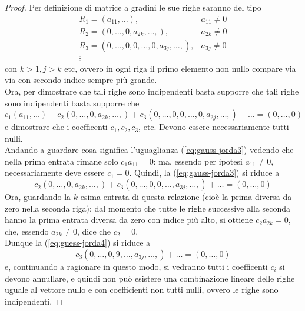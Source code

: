 \begin{proof}
  Per definizione di matrice a gradini le sue righe saranno del tipo
  \begin{eqnarray*}
    R_1=(a_{11},\dots), & a_{11}\neq0\\
    R_2=(0,\dots, 0, a_{2k},\dots,), & a_{2k}\neq 0\\
    R_3=(0,\dots,0,0,\dots,0,a_{3j},\dots,), & a_{3j}\neq 0\\
    \vdots
  \end{eqnarray*}
  con $k>1,j>k$ etc, ovvero in ogni riga il primo elemento non nullo
  compare via via con secondo indice sempre più grande.\\
  Ora, per dimostrare che tali righe sono indipendenti basta supporre che
  tali righe sono indipendenti basta supporre che
  \begin{equation}
    \label{eq:gauss-jorda3}
    c_1(a_{11},\dots)+c_2(0,\dots,0,a_{2k},\dots,)+c_3(0,\dots,0,0,\dots,
    0,a_{3j},\dots,)+\dots=(0,\dots,0)
  \end{equation}
  e dimostrare che i coefficenti $c_1,c_2,c_3$, etc. Devono essere
  necessariamente tutti nulli.\\
  Andando a guardare cosa significa l'uguaglianza (\ref{eq:gauss-jorda3})
  vedendo che nella prima entrata rimane solo $c_1a_{11}=0$: ma, essendo
  per ipotesi $a_{11}\neq 0$, necessariamente deve essere $c_1=0$. Quindi,
  la (\ref{eq:gauss-jorda3}) si riduce a
  \begin{equation}
    \label{eq:guess-jorda4}
    c_2(0,\dots,0,a_{2k},\dots,)+c_3(0,\dots,0,0,\dots,a_{3j},\dots,)+
    \dots= (0,\dots,0)
  \end{equation}
  Ora, guardando la $k$-esima entrata di questa relazione (cioè la prima
  diversa da zero nella seconda riga): dal momento che tutte le righe
  successive alla seconda hanno la prima entrata diversa da zero con
  indice più alto, si ottiene $c_2a_{2k}=0$, che, essendo $a_{2k}\neq 0$,
  dice che $c_2=0$.\\
  Dunque la (\ref{eq:guess-jorda4}) si riduce a
  \begin{equation*}
    c_3(0,\dots,0,9,\dots,a_{3j},\dots,)+\dots=(0,\dots,0)
  \end{equation*}
  e, continuando a ragionare in questo modo, si vedranno tutti i
  coefficenti $c_i$ si devono annullare, e quindi non può esistere una
  combinazione lineare delle righe uguale al vettore nullo e con
  coefficienti non tutti nulli, ovvero le righe sono indipendenti.
\end{proof}
